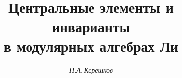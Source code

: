 




%


\newcommand{\Mod}{\operatorname{mod}} 


\newcommand{\gr}{\operatorname{gr}} 


\newcommand{\ad}{\operatorname{ad}} 


\newcommand{\Sym}{\operatorname{Sym}} 


\newcommand{\down}[2]{\underset{#1}{#2}{}} 


\newcommand{\tts}[1]{} 







\setcounter{page}{22}















\author{\it Н.А.\,Корешков}




\title{Центральные элементы и инварианты\\ в модулярных алгебрах Ли }





\date{}




\pagestyle{plain} %







